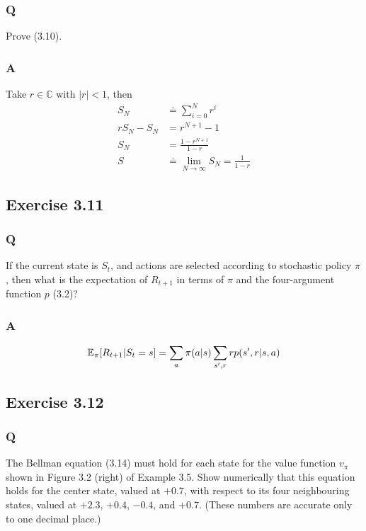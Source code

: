 \subsubsection*{Q}
Prove (3.10).

\subsubsection*{A}
Take $r \in \mathbb{C}$ with $|r| < 1$, then
\begin{align*}
    S_N &\doteq \sum_{i=0}^N r^i \\
    rS_N - S_N &= r^{N+1} - 1 \\
    S_N &= \frac{1 - r^{N+1}}{1 - r} \\
    S &\doteq \lim_{N \to \infty} S_N = \frac{1}{1 - r}
\end{align*}

\subsection{Exercise 3.11}
\subsubsection*{Q}
If the current state is $S_t$, and actions are selected according to stochastic policy $\pi$, then what is the expectation of $R_{t+1}$ in terms of $\pi$ and the four-argument function $p$ (3.2)?

\subsubsection*{A}
\begin{equation}
    \mathbb{E}_{\pi}{} [R_{t+1} | S_t = s] = \sum_{a} \pi(a | s) \sum_{s', r} r p(s', r | s, a)
\end{equation}


\subsection{Exercise 3.12}
\subsubsection*{Q}
The Bellman equation (3.14) must hold for each state for the value function $v_\pi$ shown in Figure 3.2 (right) of Example 3.5. Show numerically that this equation holds for the center state, valued at $+0.7$, with respect to its four neighbouring states, valued at $+2.3$, $+0.4$, $-0.4$, and $+0.7$. (These numbers are accurate only to one decimal place.)

